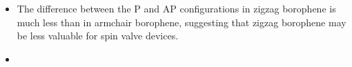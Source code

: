 \documentclass[handout,t]{beamer}
\begin{document}
\begin{frame}
	\begin{itemize}
		\item The difference between the P and AP configurations in zigzag borophene is much less than in armchair borophene, suggesting that zigzag borophene may be less valuable for spin valve devices.
		\item 
	\end{itemize}
\end{frame}
\end{document}
